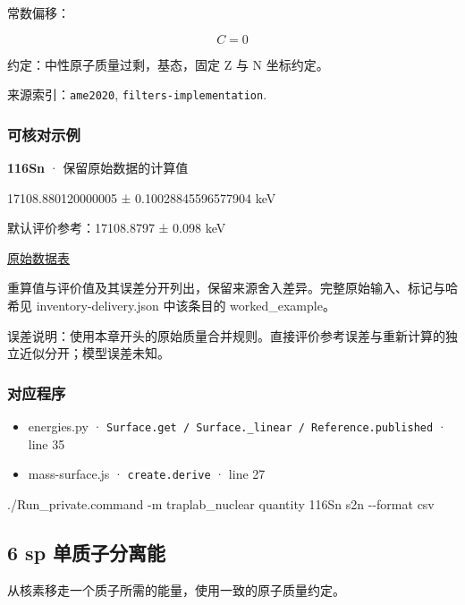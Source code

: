 \documentclass[
  11pt,
  letterpaper,
]{article}
\newenvironment{Shaded}{}{}
\newcommand{\AttributeTok}[1]{\textcolor[rgb]{0.49,0.56,0.16}{#1}}
\newcommand{\ExtensionTok}[1]{#1}
\newcommand{\NormalTok}[1]{#1}
\providecommand{\tightlist}{%
  \setlength{\itemsep}{0pt}\setlength{\parskip}{0pt}}
\begin{document}
常数偏移：

\[
C=0
\]

约定：中性原子质量过剩，基态，固定 Z 与 N 坐标约定。

来源索引：\texttt{ame2020}, \texttt{filters-implementation}.

\subsubsection{可核对示例}\label{ux53efux6838ux5bf9ux793aux4f8b-4}

\textbf{116Sn} · 保留原始数据的计算值

17108.880120000005 ± 0.10028845596577904 keV

默认评价参考：17108.8797 ± 0.098 keV

\href{https://www-nds.iaea.org/amdc/ame2020/rct1.mas20.txt}{原始数据表}

重算值与评价值及其误差分开列出，保留来源舍入差异。完整原始输入、标记与哈希见
inventory-delivery.json 中该条目的 worked\_example。

误差说明：使用本章开头的原始质量合并规则。直接评价参考误差与重新计算的独立近似分开；模型误差未知。

\subsubsection{对应程序}\label{ux5bf9ux5e94ux7a0bux5e8f-4}

\begin{itemize}
\tightlist
\item
  energies.py ·
  \texttt{Surface.get\ /\ Surface.\_linear\ /\ Reference.published} ·
  line 35
\item
  mass-surface.js · \texttt{create.derive} · line 27
\end{itemize}

\begin{Shaded}
\begin{Highlighting}[]
\ExtensionTok{./Run\_private.command} \AttributeTok{{-}m}\NormalTok{ traplab\_nuclear quantity 116Sn s2n }\AttributeTok{{-}{-}format}\NormalTok{ csv}
\end{Highlighting}
\end{Shaded}

\subsection{6 sp
单质子分离能}\label{sp-ux5355ux8d28ux5b50ux5206ux79bbux80fd}

从核素移走一个质子所需的能量，使用一致的原子质量约定。
\end{document}
